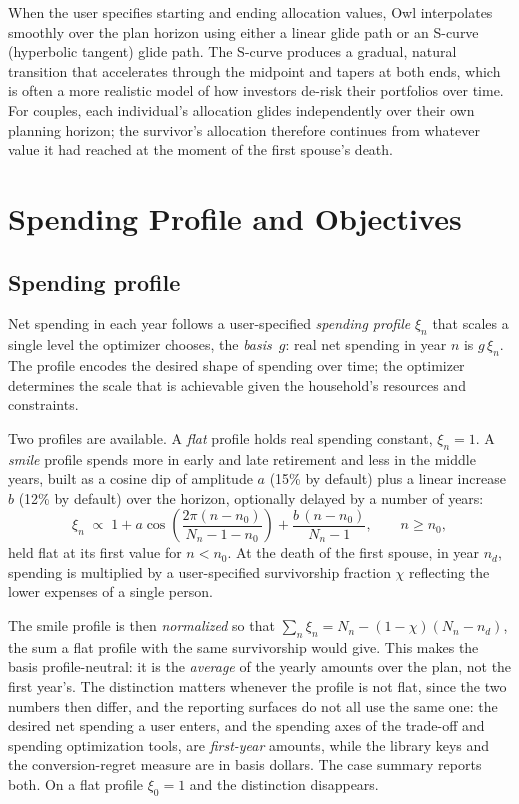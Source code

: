 \documentclass[fleqn,12pt]{report}
\begin{document}
When the user specifies starting and ending allocation values, Owl
interpolates smoothly over the plan horizon using either a linear glide
path or an S-curve (hyperbolic tangent) glide path.
The S-curve produces a gradual, natural transition that accelerates through
the midpoint and tapers at both ends, which is often a more realistic model
of how investors de-risk their portfolios over time.
For couples, each individual's allocation glides independently over their
own planning horizon; the survivor's allocation therefore continues from
whatever value it had reached at the moment of the first spouse's death.

\section{Spending Profile and Objectives}
\label{sec:spending-profile}

\subsection*{Spending profile}

Net spending in each year follows a user-specified \emph{spending profile}
$\xi_n$ that scales a single level the optimizer chooses, the \emph{basis}~$g$:
real net spending in year $n$ is $g\,\xi_n$.
The profile encodes the desired shape of spending over time; the optimizer
determines the scale that is achievable given the household's resources and
constraints.

Two profiles are available.
A \emph{flat} profile holds real spending constant, $\xi_n = 1$.
A \emph{smile} profile spends more in early and late retirement and less in the
middle years, built as a cosine dip of amplitude $a$ (15\% by default) plus a
linear increase $b$ (12\% by default) over the horizon, optionally delayed by a
number of years:
\begin{equation}
    \label{Eq:SmileProfile}
    \xi_n \;\propto\; 1 + a\cos\!\left(\frac{2\pi (n - n_0)}{N_n - 1 - n_0}\right)
        + \frac{b\,(n - n_0)}{N_n - 1},
    \qquad n \ge n_0,
\end{equation}
held flat at its first value for $n < n_0$.
At the death of the first spouse, in year $n_d$, spending is multiplied by a
user-specified survivorship fraction $\chi$ reflecting the lower expenses of a
single person.

The smile profile is then \emph{normalized} so that
$\sum_n \xi_n = N_n - (1 - \chi)(N_n - n_d)$, the sum a flat profile with the
same survivorship would give.
This makes the basis profile-neutral: it is the \emph{average} of the yearly
amounts over the plan, not the first year's.
The distinction matters whenever the profile is not flat, since the two numbers
then differ, and the reporting surfaces do not all use the same one: the desired
net spending a user enters, and the spending axes of the trade-off and spending
optimization tools, are \emph{first-year} amounts, while the library keys and the
conversion-regret measure are in basis dollars.
The case summary reports both.
On a flat profile $\xi_0 = 1$ and the distinction disappears.
\end{document}
